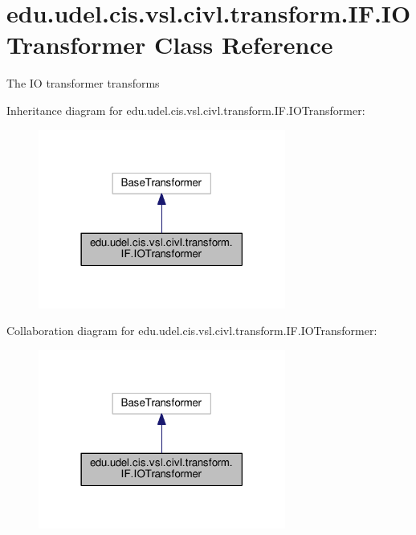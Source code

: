 \hypertarget{classedu_1_1udel_1_1cis_1_1vsl_1_1civl_1_1transform_1_1IF_1_1IOTransformer}{}\section{edu.\+udel.\+cis.\+vsl.\+civl.\+transform.\+I\+F.\+I\+O\+Transformer Class Reference}
\label{classedu_1_1udel_1_1cis_1_1vsl_1_1civl_1_1transform_1_1IF_1_1IOTransformer}


The I\+O transformer transforms~\newline
  




Inheritance diagram for edu.\+udel.\+cis.\+vsl.\+civl.\+transform.\+I\+F.\+I\+O\+Transformer\+:
\nopagebreak
\begin{figure}[H]
\begin{center}
\leavevmode
\includegraphics[width=230pt]{classedu_1_1udel_1_1cis_1_1vsl_1_1civl_1_1transform_1_1IF_1_1IOTransformer__inherit__graph}
\end{center}
\end{figure}


Collaboration diagram for edu.\+udel.\+cis.\+vsl.\+civl.\+transform.\+I\+F.\+I\+O\+Transformer\+:
\nopagebreak
\begin{figure}[H]
\begin{center}
\leavevmode
\includegraphics[width=230pt]{classedu_1_1udel_1_1cis_1_1vsl_1_1civl_1_1transform_1_1IF_1_1IOTransformer__coll__graph}
\end{center}
\end{figure}
